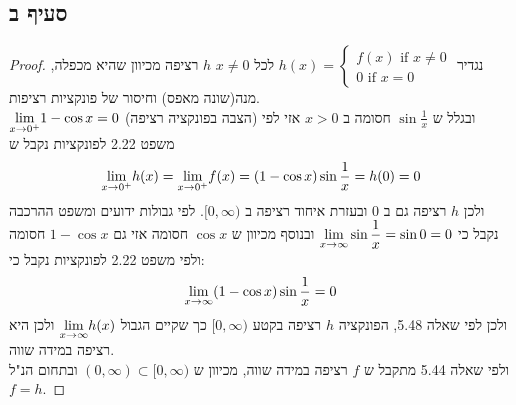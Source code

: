\documentclass{article}
\begin{document}
	\subsection*{סעיף ב}
	\begin{proof}
		נגדיר $h(x) = \begin{cases}
			f(x) \text{ if } x \neq 0 \\
			0 \text{ if } x = 0
		\end{cases}$
		לכל $x \neq 0$ $h$ רציפה מכיוון שהיא מכפלה, מנה(שונה מאפס) וחיסור של פונקציות רציפות. \\
		$\displaystyle{\lim_{x \to 0^+}} 1 - \cos x = 0$ (הצבה בפונקציה רציפה) ובגלל ש $\sin \frac{1}{x}$ חסומה ב $x > 0$ אזי לפי משפט 2.22 לפונקציות נקבל ש
		\[\displaystyle{\lim_{x \to 0^+}} h(x) = \displaystyle{\lim_{x \to 0^+}} f(x) = (1 - \cos x) \sin \frac{1}{x} = h(0) = 0\]
		ולכן $h$ רציפה גם ב 0 ובעזרת איחוד רציפה ב $[0, \infty)$.
		לפי גבולות ידועים ומשפט ההרכבה נקבל כי $\displaystyle{\lim_{x \to \infty}} \sin \frac{1}{x} = \sin 0 = 0$
		ובנוסף מכיוון ש $\cos x$ חסומה אזי גם $1- \cos x$ חסומה ולפי משפט 2.22 לפונקציות נקבל כי:
		\[\displaystyle{\lim_{x \to \infty}} (1 - \cos x) \sin \frac{1}{x} = 0 \]
		ולכן לפי שאלה 5.48, הפונקציה $h$ רציפה בקטע $[0, \infty)$ כך שקיים הגבול $\displaystyle{\lim_{x \to \infty}} h(x)$ ולכן היא רציפה במידה שווה. \\
		ולפי שאלה 5.44 מתקבל ש $f$ רציפה במידה שווה, מכיוון ש $(0, \infty) \subset [0, \infty)$ ובתחום הנ"ל $f=h$.
	\end{proof}
\end{document}
